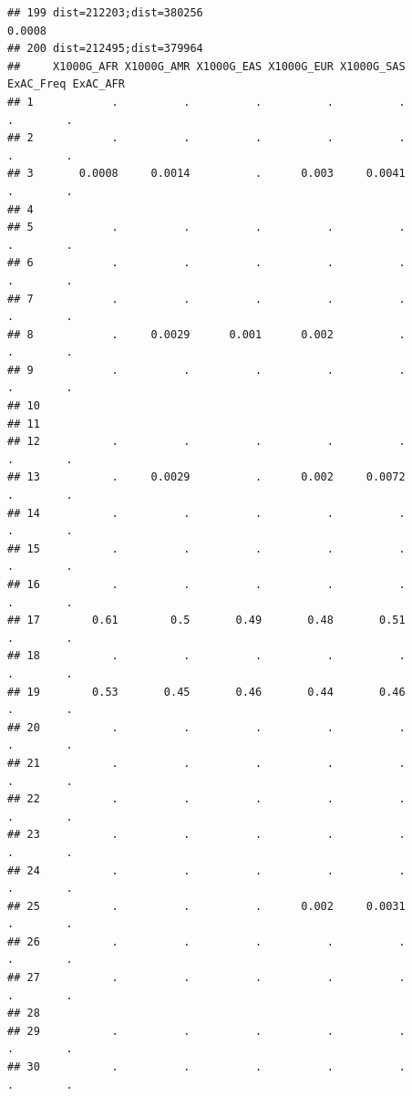 \documentclass[
]{article}
\begin{document}
\begin{verbatim}
## 199 dist=212203;dist=380256                                         0.0008
## 200 dist=212495;dist=379964                                               
##     X1000G_AFR X1000G_AMR X1000G_EAS X1000G_EUR X1000G_SAS ExAC_Freq ExAC_AFR
## 1            .          .          .          .          .         .        .
## 2            .          .          .          .          .         .        .
## 3       0.0008     0.0014          .      0.003     0.0041         .        .
## 4                                                                            
## 5            .          .          .          .          .         .        .
## 6            .          .          .          .          .         .        .
## 7            .          .          .          .          .         .        .
## 8            .     0.0029      0.001      0.002          .         .        .
## 9            .          .          .          .          .         .        .
## 10                                                                           
## 11                                                                           
## 12           .          .          .          .          .         .        .
## 13           .     0.0029          .      0.002     0.0072         .        .
## 14           .          .          .          .          .         .        .
## 15           .          .          .          .          .         .        .
## 16           .          .          .          .          .         .        .
## 17        0.61        0.5       0.49       0.48       0.51         .        .
## 18           .          .          .          .          .         .        .
## 19        0.53       0.45       0.46       0.44       0.46         .        .
## 20           .          .          .          .          .         .        .
## 21           .          .          .          .          .         .        .
## 22           .          .          .          .          .         .        .
## 23           .          .          .          .          .         .        .
## 24           .          .          .          .          .         .        .
## 25           .          .          .      0.002     0.0031         .        .
## 26           .          .          .          .          .         .        .
## 27           .          .          .          .          .         .        .
## 28                                                                           
## 29           .          .          .          .          .         .        .
## 30           .          .          .          .          .         .        .

\end{verbatim}
\end{document}

